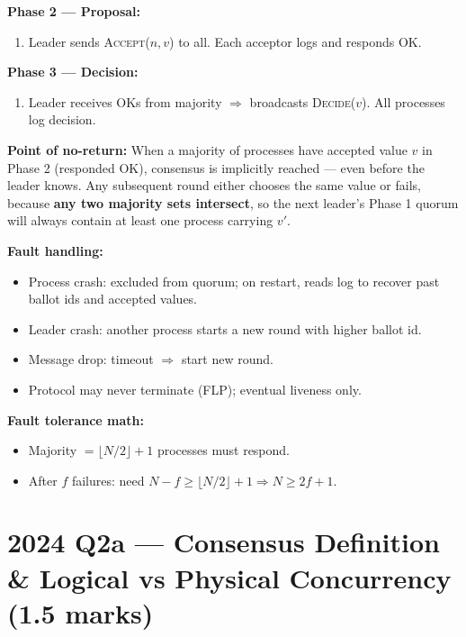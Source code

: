 \documentclass[12pt,a4paper]{article}
\begin{document}
\textbf{Phase 2 --- Proposal:}
\begin{enumerate}[noitemsep]
  \item Leader sends \textsc{Accept}($n, v$) to all. Each acceptor logs and responds OK.
\end{enumerate}

\textbf{Phase 3 --- Decision:}
\begin{enumerate}[noitemsep]
  \item Leader receives OKs from majority $\Rightarrow$ broadcasts \textsc{Decide}($v$). All processes log decision.
\end{enumerate}

\textbf{Point of no-return:} When a majority of processes have accepted value $v$ in Phase 2 (responded OK), consensus is implicitly reached --- even before the leader knows. Any subsequent round either chooses the same value or fails, because \textbf{any two majority sets intersect}, so the next leader's Phase 1 quorum will always contain at least one process carrying $v'$.

\textbf{Fault handling:}
\begin{itemize}[noitemsep]
  \item Process crash: excluded from quorum; on restart, reads log to recover past ballot ids and accepted values.
  \item Leader crash: another process starts a new round with higher ballot id.
  \item Message drop: timeout $\Rightarrow$ start new round.
  \item Protocol may never terminate (FLP); eventual liveness only.
\end{itemize}

\textbf{Fault tolerance math:}
\begin{itemize}[noitemsep]
  \item Majority $= \lfloor N/2\rfloor + 1$ processes must respond.
  \item After $f$ failures: need $N - f \geq \lfloor N/2\rfloor + 1 \Rightarrow N \geq 2f+1$.
\end{itemize}

\section{2024 Q2a --- Consensus Definition \& Logical vs Physical Concurrency (1.5 marks)}
\end{document}
